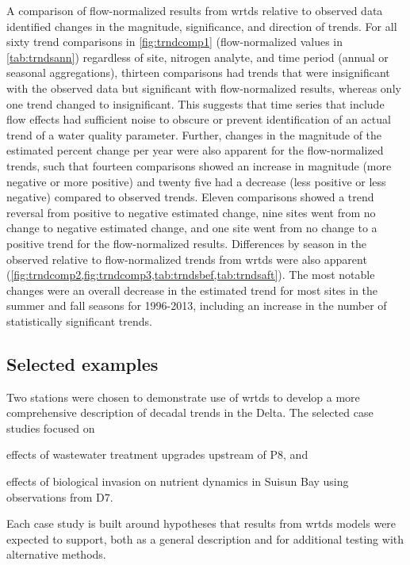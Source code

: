\documentclass[letterpaper,12pt,oneside]{article}\usepackage[]{graphicx}\usepackage[]{color}
\begin{document}
A comparison of flow-normalized results from \ac{wrtds} relative to observed data identified changes in the magnitude, significance, and direction of trends. For all sixty trend comparisons in \cref{fig:trndcomp1} (flow-normalized values in \cref{tab:trndsann}) regardless of site, nitrogen analyte, and time period (annual or seasonal aggregations), thirteen comparisons had trends that were insignificant with the observed data but significant with flow-normalized results, whereas only one trend changed to insignificant. This suggests that time series that include flow effects had sufficient noise to obscure or prevent identification of an actual trend of a water quality parameter. Further, changes in the magnitude of the estimated percent change per year were also apparent for the flow-normalized trends, such that fourteen comparisons showed an increase in magnitude (more negative or more positive) and twenty five had a decrease (less positive or less negative) compared to observed trends.  Eleven comparisons showed a trend reversal from positive to negative estimated change, nine sites went from no change to negative estimated change, and one site went from no change to a positive trend for the flow-normalized results. Differences by season in the observed relative to flow-normalized trends from \ac{wrtds} were also apparent (\cref{fig:trndcomp2,fig:trndcomp3,tab:trndsbef,tab:trndsaft}). The most notable changes were an overall decrease in the estimated trend for most sites in the summer and fall seasons for 1996-2013, including an increase in the number of statistically significant trends.

\subsection{Selected examples}

Two stations were chosen to demonstrate use of \ac{wrtds} to develop a more comprehensive description of decadal trends in the Delta.  The selected case studies focused on \begin{inparaenum}[1\upshape)]		
\item effects of wastewater treatment upgrades upstream of P8, and		
\item effects of biological invasion on nutrient dynamics in Suisun Bay using observations from D7.		
\end{inparaenum}		
Each case study is built around hypotheses that results from \ac{wrtds} models were expected to support, both as a general description and for additional testing with alternative methods. 
\end{document}
